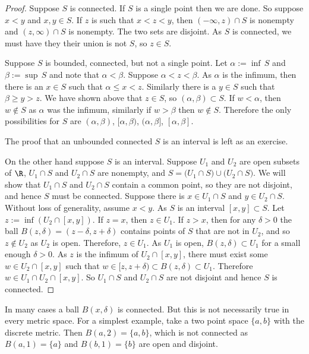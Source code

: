 \documentclass[12pt]{book}
\begin{document}
\begin{proof}
Suppose $S$ is connected.
If $S$ is a single point
then we are done.
So suppose $x < y$ and $x,y \in S$.
If $z$ is such
that $x < z < y$, then $(-\infty,z) \cap S$ is nonempty and $(z,\infty) \cap
S$ is nonempty.
The two sets are disjoint.
As
$S$ is connected, we must have they their union is not $S$, so $z \in S$.

Suppose $S$ is bounded, connected, but not a single point.
Let $\alpha := \inf \, S$ and
$\beta := \sup \, S$ and note that $\alpha < \beta$.
Suppose $\alpha < z < \beta$.
As $\alpha$ is the
infimum, then there is an $x \in S$ such that $\alpha \leq x < z$.
Similarly
there is a $y \in S$ such that $\beta \geq y > z$. 
We have shown above that $z \in S$, so $(\alpha,\beta) \subset S$.
If $w < \alpha$, then $w \notin S$
as $\alpha$ was the infimum,
similarly if $w > \beta$ then $w \notin S$.
Therefore the only
possibilities for $S$ are
$(\alpha,\beta)$,
$[\alpha,\beta)$,
$(\alpha,\beta]$,
$[\alpha,\beta]$.

The proof that an unbounded connected $S$ is an interval is left as an exercise.

On the other hand suppose $S$ is an interval.
Suppose $U_1$ and $U_2$ are open subsets of $\R$,
$U_1 \cap S$ and $U_2 \cap S$ are nonempty, and
$S = 
\bigl( U_1 \cap S \bigr)
\cup
\bigl( U_2 \cap S \bigr)$.
We will show that $U_1 \cap S$
and $U_2 \cap S$ contain a common point, so they are not disjoint,
and hence $S$ must be connected.
Suppose there is $x \in U_1 \cap S$
and $y \in U_2 \cap S$.
Without loss of generality, assume $x < y$.
As $S$ is an interval
$[x,y] \subset S$.
Let $z := \inf (U_2 \cap [x,y])$.
If $z = x$, then $z
\in U_1$.
If $z > x$,
then for any $\delta > 0$ the 
ball $B(z,\delta) =
(z-\delta,z+\delta)$ contains points of $S$ that are not
in $U_2$, and so $z \notin U_2$ as $U_2$ is open.
Therefore, $z \in U_1$.
As $U_1$ is open, $B(z,\delta) \subset U_1$ for a small enough $\delta >
0$.
As $z$ is the infimum of $U_2 \cap [x,y]$, 
there must exist some $w \in U_2 \cap [x,y]$
such that $w \in [z,z+\delta) \subset B(z,\delta) \subset U_1$.
Therefore $w \in U_1 \cap U_2 \cap [x,y]$.
So $U_1 \cap S$ and $U_2 \cap S$ are not disjoint and hence $S$ is connected.
\end{proof}

\begin{example}
In many cases a ball $B(x,\delta)$ is connected.
But this is not
necessarily true in every metric space.
For a simplest example, take a two point space $\{ a,
b\}$ with the discrete metric.
Then $B(a,2) = \{ a , b \}$, which is not
connected as $B(a,1) = \{ a \}$ and 
$B(b,1) = \{ b \}$ are open and disjoint.
\end{example}
\end{document}
